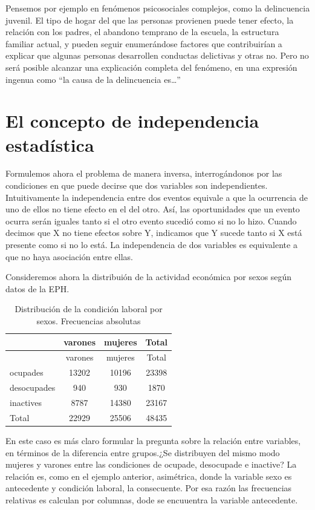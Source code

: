 \documentclass[]{book}
\begin{document}
Pensemos por ejemplo en fenómenos psicosociales complejos, como la delincuencia juvenil. El tipo de hogar del que las personas provienen
puede tener efecto, la relación con los padres, el abandono temprano de la escuela, la estructura familiar actual, y pueden seguir enumerándose factores que contribuirían a explicar que algunas personas desarrollen conductas delictivas y otras no. Pero no será posible alcanzar una explicación completa del fenómeno, en una expresión ingenua como ``la causa de la delincuencia es\ldots{}''

\hypertarget{el-concepto-de-independencia-estadistica}{%
\section{El concepto de independencia estadística}\label{el-concepto-de-independencia-estadistica}}

Formulemos ahora el problema de manera inversa, interrogándonos por las
condiciones en que puede decirse que dos variables son independientes.
Intuitivamente la independencia entre dos eventos equivale a que la
ocurrencia de uno de ellos no tiene efecto en el del otro. Así, las
oportunidades que un evento ocurra serán iguales tanto si el otro evento
sucedió como si no lo hizo. Cuando decimos que X no tiene efectos sobre
Y, indicamos que Y sucede tanto si X está presente como si no lo está.
La independencia de dos variables es equivalente a que no haya
asociación entre ellas.

Consideremos ahora la distribuión de la actividad económica por sexos según datos de la EPH.

\begin{longtable}[]{@{}lccc@{}}
\caption{\label{tab:unnamed-chunk-121}Distribución de la condición laboral por sexos. Frecuencias absolutas}\tabularnewline
\toprule
& varones & mujeres & Total\tabularnewline
\midrule
\endfirsthead
\toprule
& varones & mujeres & Total\tabularnewline
\midrule
\endhead
ocupades & 13202 & 10196 & 23398\tabularnewline
desocupades & 940 & 930 & 1870\tabularnewline
inactives & 8787 & 14380 & 23167\tabularnewline
Total & 22929 & 25506 & 48435\tabularnewline
\bottomrule
\end{longtable}

En este caso es más claro formular la pregunta sobre la relación entre variables, en términos de la diferencia entre grupos.¿Se distribuyen del mismo modo mujeres y varones entre las condiciones de ocupade, desocupade e inactive? La relación es, como en el ejemplo anterior, asimétrica, donde la variable sexo es antecedente y condición laboral, la consecuente. Por esa razón las frecuencias relativas es calculan por columnas, dode se encuuentra la variable antecedente.
\end{document}
